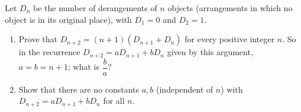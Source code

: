 Let $D_n$ be the number of derangements of $n$ objects (arrangements in which no object is in its original place), with $D_1=0$ and $D_2=1$.
\begin{enumerate}
\item[(a)] Prove that $D_{n+2}=(n+1)\left(D_{n+1}+D_n\right)$ for every positive integer $n$. So in the recurrence $D_{n+2}=aD_{n+1}+bD_n$ given by this argument, $a=b=n+1$; what is $\dfrac {b}{a}$?
\item[(b)] Show that there are no constants $a,b$ (independent of $n$) with $D_{n+2}=aD_{n+1}+bD_n$ for all $n$.
\end{enumerate}
